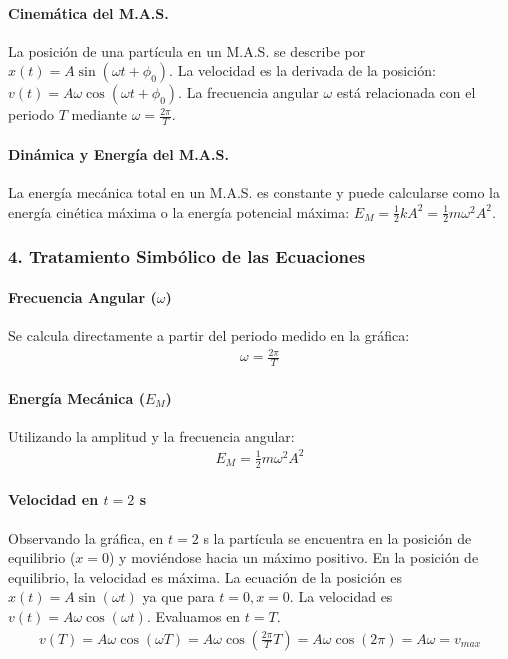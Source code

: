 \paragraph*{Cinemática del M.A.S.}
La posición de una partícula en un M.A.S. se describe por $x(t) = A \sin(\omega t + \phi_0)$. La velocidad es la derivada de la posición: $v(t) = A\omega \cos(\omega t + \phi_0)$. La frecuencia angular $\omega$ está relacionada con el periodo $T$ mediante $\omega = \frac{2\pi}{T}$.
\paragraph*{Dinámica y Energía del M.A.S.}
La energía mecánica total en un M.A.S. es constante y puede calcularse como la energía cinética máxima o la energía potencial máxima: $E_M = \frac{1}{2} k A^2 = \frac{1}{2} m \omega^2 A^2$.

\subsubsection*{4. Tratamiento Simbólico de las Ecuaciones}
\paragraph*{Frecuencia Angular ($\omega$)}
Se calcula directamente a partir del periodo medido en la gráfica:
\begin{gather}
    \omega = \frac{2\pi}{T}
\end{gather}
\paragraph*{Energía Mecánica ($E_M$)}
Utilizando la amplitud y la frecuencia angular:
\begin{gather}
    E_M = \frac{1}{2} m \omega^2 A^2
\end{gather}
\paragraph*{Velocidad en $t=2$ s}
Observando la gráfica, en $t=2$ s la partícula se encuentra en la posición de equilibrio ($x=0$) y moviéndose hacia un máximo positivo. En la posición de equilibrio, la velocidad es máxima. La ecuación de la posición es $x(t) = A \sin(\omega t)$ ya que para $t=0, x=0$. La velocidad es $v(t) = A\omega \cos(\omega t)$. Evaluamos en $t=T$.
\begin{gather}
    v(T) = A\omega \cos(\omega T) = A\omega \cos\left(\frac{2\pi}{T} T\right) = A\omega \cos(2\pi) = A\omega = v_{max}
\end{gather}

